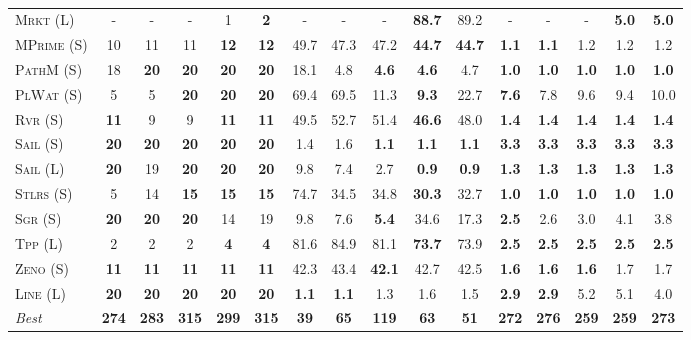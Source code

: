 \documentclass[11pt,landscape]{article}
\begin{document}
\begin{table*}[tb]
{\begin{tabular}{|l||ccccc||ccccc||ccccc||}
\textsc{Mrkt} (L)&-&-&-&1&\textbf{2}&-&-&-&\textbf{88.7}&89.2&-&-&-&\textbf{5.0}&\textbf{5.0}\\
\textsc{MPrime} (S)&10&11&11&\textbf{12}&\textbf{12}&49.7&47.3&47.2&\textbf{44.7}&\textbf{44.7}&\textbf{1.1}&\textbf{1.1}&1.2&1.2&1.2\\
\textsc{PathM} (S)&18&\textbf{20}&\textbf{20}&\textbf{20}&\textbf{20}&18.1&4.8&\textbf{4.6}&\textbf{4.6}&4.7&\textbf{1.0}&\textbf{1.0}&\textbf{1.0}&\textbf{1.0}&\textbf{1.0}\\
\textsc{PlWat} (S)&5&5&\textbf{20}&\textbf{20}&\textbf{20}&69.4&69.5&11.3&\textbf{9.3}&22.7&\textbf{7.6}&7.8&9.6&9.4&10.0\\
\textsc{Rvr} (S)&\textbf{11}&9&9&\textbf{11}&\textbf{11}&49.5&52.7&51.4&\textbf{46.6}&48.0&\textbf{1.4}&\textbf{1.4}&\textbf{1.4}&\textbf{1.4}&\textbf{1.4}\\
\textsc{Sail} (S)&\textbf{20}&\textbf{20}&\textbf{20}&\textbf{20}&\textbf{20}&1.4&1.6&\textbf{1.1}&\textbf{1.1}&\textbf{1.1}&\textbf{3.3}&\textbf{3.3}&\textbf{3.3}&\textbf{3.3}&\textbf{3.3}\\
\textsc{Sail} (L)&\textbf{20}&19&\textbf{20}&\textbf{20}&\textbf{20}&9.8&7.4&2.7&\textbf{0.9}&\textbf{0.9}&\textbf{1.3}&\textbf{1.3}&\textbf{1.3}&\textbf{1.3}&\textbf{1.3}\\
\textsc{Stlrs} (S)&5&14&\textbf{15}&\textbf{15}&\textbf{15}&74.7&34.5&34.8&\textbf{30.3}&32.7&\textbf{1.0}&\textbf{1.0}&\textbf{1.0}&\textbf{1.0}&\textbf{1.0}\\
\textsc{Sgr} (S)&\textbf{20}&\textbf{20}&\textbf{20}&14&19&9.8&7.6&\textbf{5.4}&34.6&17.3&\textbf{2.5}&2.6&3.0&4.1&3.8\\
\textsc{Tpp} (L)&2&2&2&\textbf{4}&\textbf{4}&81.6&84.9&81.1&\textbf{73.7}&73.9&\textbf{2.5}&\textbf{2.5}&\textbf{2.5}&\textbf{2.5}&\textbf{2.5}\\
\textsc{Zeno} (S)&\textbf{11}&\textbf{11}&\textbf{11}&\textbf{11}&\textbf{11}&42.3&43.4&\textbf{42.1}&42.7&42.5&\textbf{1.6}&\textbf{1.6}&\textbf{1.6}&1.7&1.7\\
\textsc{Line} (L)&\textbf{20}&\textbf{20}&\textbf{20}&\textbf{20}&\textbf{20}&\textbf{1.1}&\textbf{1.1}&1.3&1.6&1.5&\textbf{2.9}&\textbf{2.9}&5.2&5.1&4.0
\\\hline
\textit{Best}&\textbf{274}&\textbf{283}&\textbf{315}&\textbf{299}&\textbf{315}&\textbf{39}&\textbf{65}&\textbf{119}&\textbf{63}&\textbf{51}&\textbf{272}&\textbf{276}&\textbf{259}&\textbf{259}&\textbf{273}\\\hline

        \end{tabular}}
        \caption{}
        \label{tab:all-patty}
        \end{table*}
        
\end{document}
